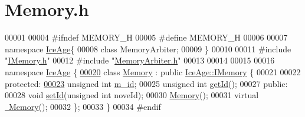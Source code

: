 \hypertarget{Memory_8h_source}{}\section{Memory.\+h}
\label{Memory_8h_source}

\begin{DoxyCode}
00001 
00004 \textcolor{preprocessor}{#ifndef MEMORY\_H}
00005 \textcolor{preprocessor}{#define MEMORY\_H}
00006 
00007 \textcolor{keyword}{namespace }\hyperlink{namespaceIceAge}{IceAge}\{
00008     \textcolor{keyword}{class }MemoryArbiter;
00009 \}
00010 
00011 \textcolor{preprocessor}{#include "\hyperlink{IMemory_8h}{IMemory.h}"}
00012 \textcolor{preprocessor}{#include "\hyperlink{MemoryArbiter_8h}{MemoryArbiter.h}"}
00013 
00014 
00015 
00016 \textcolor{keyword}{namespace }\hyperlink{namespaceIceAge}{IceAge} \{
\hypertarget{Memory_8h_source.tex_l00020}{}\hyperlink{classIceAge_1_1Memory}{00020}     \textcolor{keyword}{class }\hyperlink{classIceAge_1_1Memory}{Memory} : \textcolor{keyword}{public} \hyperlink{classIceAge_1_1IMemory}{IceAge::IMemory} \{
00021 
00022     \textcolor{keyword}{protected}:
\hypertarget{Memory_8h_source.tex_l00023}{}\hyperlink{classIceAge_1_1Memory_a50782825cb2229e1a3dad9fbc7b0d0d8}{00023}         \textcolor{keywordtype}{unsigned} \textcolor{keywordtype}{int} \hyperlink{classIceAge_1_1Memory_a50782825cb2229e1a3dad9fbc7b0d0d8}{m\_id};
00025         \textcolor{keywordtype}{unsigned} \textcolor{keywordtype}{int} \hyperlink{classIceAge_1_1Memory_ac8f0e51954a707e4653b7f8a1af5fac1}{getId}();
00027     \textcolor{keyword}{public}:
00028         \textcolor{keywordtype}{void} \hyperlink{classIceAge_1_1Memory_aeea129a4caa3506bbfa5287a4f61fc90}{setId}(\textcolor{keywordtype}{unsigned} \textcolor{keywordtype}{int} noveId);
00030         \hyperlink{classIceAge_1_1Memory_ae81d5a52a6b6d8f25e36689126b0d0c9}{Memory}();
00031         \textcolor{keyword}{virtual} \hyperlink{classIceAge_1_1Memory_ae2163982f0e32013f5b992c47752b5fd}{~Memory}();
00032     \};
00033 \}
00034 \textcolor{preprocessor}{#endif}
\end{DoxyCode}
